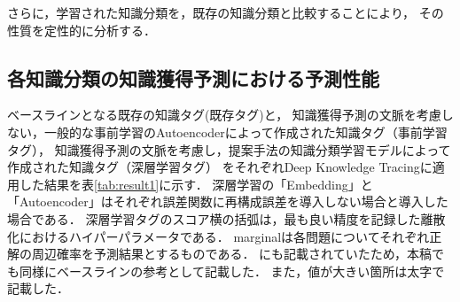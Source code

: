 さらに，学習された知識分類を，既存の知識分類と比較することにより，
その性質を定性的に分析する．



\subsection{各知識分類の知識獲得予測における予測性能}

\begin{table}[t]
\caption{各知識分類の知識獲得予測における予測性能}
\label{tab:result1}
\begin{center}
\end{center}
\end{table}


ベースラインとなる既存の知識タグ(既存タグ)と，
知識獲得予測の文脈を考慮しない，一般的な事前学習のAutoencoderによって作成された知識タグ（事前学習タグ），
知識獲得予測の文脈を考慮し，提案手法の知識分類学習モデルによって作成された知識タグ（深層学習タグ）
をそれぞれDeep Knowledge Tracingに適用した結果を表\ref{tab:result1}に示す．
深層学習の「Embedding」と「Autoencoder」はそれぞれ誤差関数に再構成誤差を導入しない場合と導入した場合である．
深層学習タグのスコア横の括弧は，最も良い精度を記録した離散化におけるハイパーパラメータである．
marginalは各問題についてそれぞれ正解の周辺確率を予測結果とするものである．
\cite{piech2015deep}にも記載されていたため，本稿でも同様にベースラインの参考として記載した．
また，値が大きい箇所は太字で記載した．


